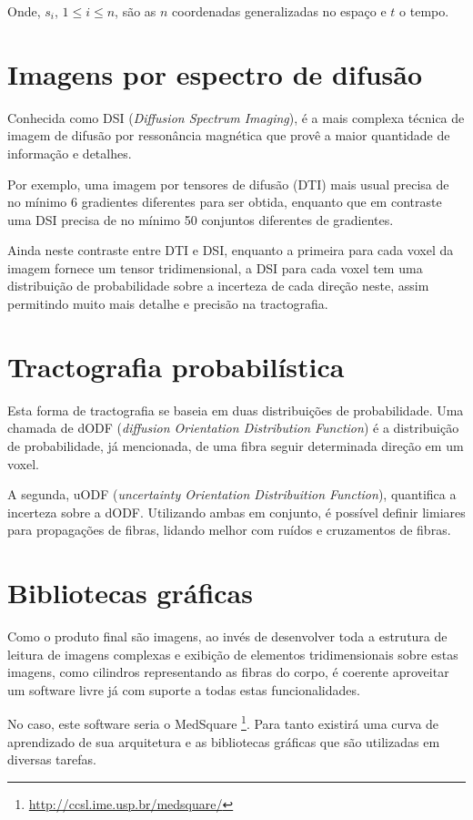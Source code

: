 \documentclass[a4paper,11pt]{report}
\begin{document}
    Onde, $s_{i}$, $1 \leq i \leq n$, são as $n$ coordenadas generalizadas no espaço e $t$ o tempo.
    
    
  \section{Imagens por espectro de difusão}
  Conhecida como DSI (\textit{Diffusion Spectrum Imaging}), é a mais complexa técnica de imagem de difusão por ressonância magnética que provê a maior quantidade de informação e detalhes.

  Por exemplo, uma imagem por tensores de difusão (DTI) mais usual precisa de no mínimo 6 gradientes diferentes para ser obtida, enquanto que em contraste uma DSI precisa de no mínimo 50 conjuntos diferentes de gradientes.

  Ainda neste contraste entre DTI e DSI, enquanto a primeira para cada voxel da imagem fornece um tensor tridimensional, a DSI para cada voxel tem uma distribuição de probabilidade sobre a incerteza de cada direção neste, assim permitindo muito mais detalhe e precisão na tractografia.

  \section{Tractografia probabilística}
  Esta forma de tractografia se baseia em duas distribuições de probabilidade. Uma chamada de dODF (\textit{diffusion Orientation Distribution Function}) é a distribuição de probabilidade, já mencionada, de uma fibra seguir determinada direção em um voxel.
  
  A segunda, uODF (\textit{uncertainty Orientation Distribuition Function}), quantifica a incerteza sobre a dODF. Utilizando ambas em conjunto, é possível definir limiares para propagações de fibras, lidando melhor com ruídos e cruzamentos de fibras.
  
  \section{Bibliotecas gráficas}
  Como o produto final são imagens, ao invés de desenvolver toda a estrutura de leitura de imagens complexas e exibição de elementos tridimensionais sobre estas imagens, como cilindros representando as fibras do corpo, é coerente aproveitar um software livre já com suporte a todas estas funcionalidades.
  
  No caso, este software seria o MedSquare \footnote{\url{http://ccsl.ime.usp.br/medsquare/}}. Para tanto existirá uma curva de aprendizado de sua arquitetura e as bibliotecas gráficas que são utilizadas em diversas tarefas.
  
\end{document}
